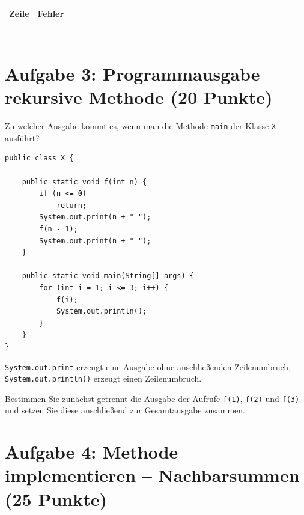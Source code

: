 \documentclass[
	fontsize=12pt,
	paper=a4,
	numbers=noenddot,
	parskip=half,
	openany
]{scrbook}
\begin{document}
\begin{center}
\begin{tabular}{|p{1.6cm}|p{10.5cm}|}
	\hline
	\textbf{Zeile} & \textbf{Fehler} \\ \hline
	 & \\[2cm] \hline
	 & \\[2cm] \hline
	 & \\[2cm] \hline
	 & \\[2cm] \hline
	 & \\[2cm] \hline
\end{tabular}
\end{center}

\clearpage
\section*{Aufgabe 3: Programmausgabe -- rekursive Methode \hfill (20 Punkte)}

Zu welcher Ausgabe kommt es, wenn man die Methode \texttt{main} der Klasse \texttt{X} ausführt?

\begin{lstlisting}
public class X {

    public static void f(int n) {
        if (n <= 0)
            return;
        System.out.print(n + " ");
        f(n - 1);
        System.out.print(n + " ");
    }

    public static void main(String[] args) {
        for (int i = 1; i <= 3; i++) {
            f(i);
            System.out.println();
        }
    }
}
\end{lstlisting}

\begin{hinweis}[Hinweis]
	\texttt{System.out.print} erzeugt eine Ausgabe ohne anschließenden Zeilenumbruch, \texttt{System.out.println()} erzeugt einen Zeilenumbruch.
\end{hinweis}

\begin{hinweis}[Empfehlung]
	Bestimmen Sie zunächst getrennt die Ausgabe der Aufrufe \texttt{f(1)}, \texttt{f(2)} und \texttt{f(3)} und setzen Sie diese anschließend zur Gesamtausgabe zusammen.
\end{hinweis}

\clearpage
\section*{Aufgabe 4: Methode implementieren -- Nachbarsummen \hfill (25 Punkte)}
\end{document}
